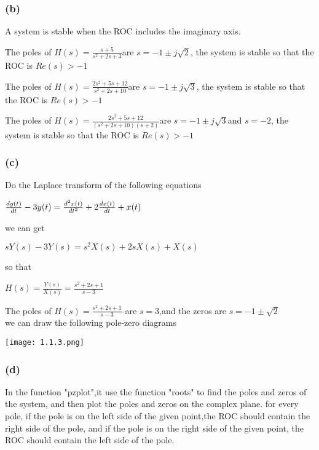 \documentclass{article}
\begin{document}
\subsubsection*{(b)}
A system is stable when the ROC includes the imaginary axis. 

The poles of $H(s)=\frac{s+5}{s^2+2s+3}$are $s = -1 \pm j\sqrt{2}$,
the system is stable so that the ROC is $Re(s) > -1$

The poles of $H(s) = \frac{2s^2+5s+12}{s^2+2s+10}$are $s = -1 \pm j\sqrt{3}$,
the system is stable so that the ROC is $Re(s) > -1$

The poles of $H(s)=\frac{2s^2+5s+12}{(s^2+2s+10)(s+2)}$are $s = -1 \pm j\sqrt{3}$and $s = -2$,
the system is stable so that the ROC is $Re(s) > -1$

\subsubsection*{(c)}
Do the Laplace transform of the following equations
\begin{center}
    \begin{math}
        \centering
        \frac{dy(t)}{dt} - 3y(t) = \frac{d^2x(t)}{dt^2} + 2\frac{dx(t)}{dt} + x(t)
    \end{math}
\end{center}
we can get
\begin{center}
    \begin{math}
        sY(s) - 3Y(s) = s^2X(s) + 2sX(s) + X(s)
    \end{math}
\end{center}
so that
\begin{center}
    \begin{math}
        H(s) = \frac{Y(s)}{X(s)} = \frac{s^2+2s+1}{s-3}
    \end{math}
\end{center}

The poles of $H(s) = \frac{s^2+2s+1}{s-3}$ are $s = 3$,and the zeros are $s = -1 \pm \sqrt{2}$\\

we can draw the following pole-zero diagrams
\begin{center}
    \texttt{[image: 1.1.3.png]}
\end{center}

\subsubsection*{(d)}
In the function "pzplot",it use the function "roots" to find the poles and zeros of the system, and then plot the poles and zeros on the complex plane.
for every pole, if the pole is on the left side of the given point,the ROC should contain the right side of the pole, and if the pole is on the right side of the given point, the ROC should contain the left side of the pole.\\
\end{document}
